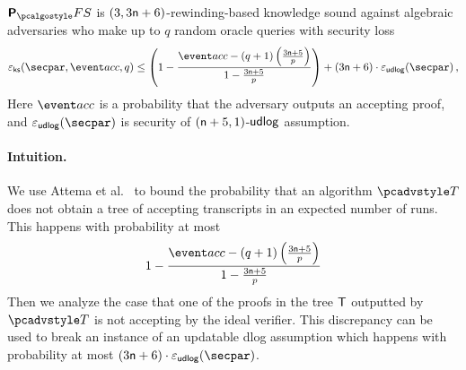 \begin{lemma}
	\label{lem:plonkprot_ss}
	$\plonkprotfs$ is $(3, 3 \mathsf{n} + 6)$-rewinding-based knowledge sound against algebraic adversaries who make up to $q$ random oracle queries with security loss 
	\[
	\epscss(\secpar,\accProb, q) \leq \left(1 - \frac{\accProb - (q + 1) \left(\frac{3 \noofc + 5}{p} \right)}{1 - \frac{3 \noofc + 5}{p}}\right) + (3 \noofc + 6) \cdot \epsudlog (\secpar) %
	\,,
	\]
	Here $\accProb$ is a probability that the adversary outputs an accepting proof, 
	and $\epsudlog(\secpar)$ is security of $(\mathsf{n} + 5, 1)$-$\mathsf{udlog}$ 
	assumption.
\end{lemma}

\paragraph{Intuition.} We use Attema et al.~\cite[Proposition 2]{EPRINT:AttFehKlo21} to bound the probability that an algorithm $\tdv$ does not obtain a tree of accepting transcripts in an expected number of runs. This happens with probability at most
	\[
	1 - \frac{\accProb - (q + 1) \left(\frac{3 \noofc + 5}{p} \right)}{1 - \frac{3 \noofc + 5}{p}}
	\]
Then we analyze the case that one of the proofs in the tree $\mathsf{T}$ outputted by $\tdv$ is not accepting by the ideal verifier. This discrepancy can be used to break an instance of an updatable dlog assumption which happens with probability at most $(3 \noofc + 6)  \cdot \epsudlog (\secpar)$. %

